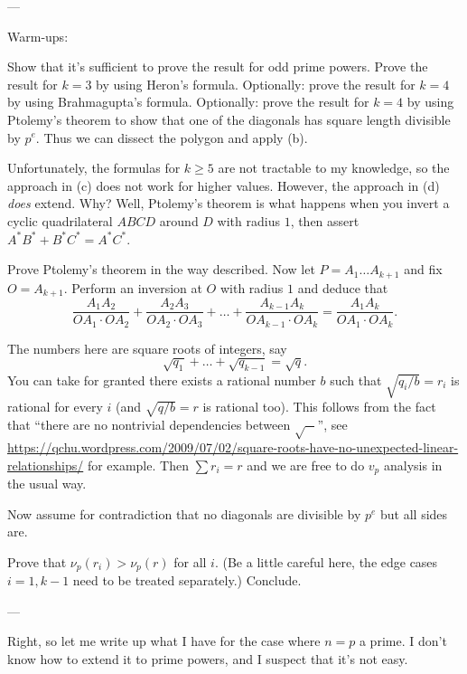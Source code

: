 ---

Warm-ups:
\begin{walk}
  \ii Show that it's sufficient to prove
  the result for odd prime powers.
  \ii Prove the result for $k = 3$ by using Heron's formula.
  \ii Optionally: prove the result for $k = 4$ by using Brahmagupta's formula.
  \ii Optionally: prove the result for $k = 4$ by using Ptolemy's theorem
  to show that one of the diagonals has square length divisible by $p^e$.
  Thus we can dissect the polygon and apply (b).
\end{walk}
Unfortunately, the formulas for $k \ge 5$ are not tractable
to my knowledge, so the approach in (c)
does not work for higher values.
However, the approach in (d) \emph{does} extend. Why?
Well, Ptolemy's theorem is what happens when you invert
a cyclic quadrilateral $ABCD$ around $D$ with radius $1$,
then assert $A^\ast B^\ast + B^\ast C^\ast = A^\ast C^\ast$.
\begin{walk}[resume]
  \ii Prove Ptolemy's theorem in the way described.
  \ii Now let $P = A_1 \dots A_{k+1}$ and fix $O = A_{k+1}$.
  Perform an inversion at $O$ with radius $1$ and deduce that
  \[
    \frac{A_1A_2}{OA_1 \cdot OA_2}
    + \frac{A_2A_3}{OA_2 \cdot OA_3}
    + \dots
    + \frac{A_{k-1} A_k}{OA_{k-1} \cdot OA_k}
    = \frac{A_1 A_k}{OA_1 \cdot OA_k}.
  \]
\end{walk}
The numbers here are square roots of integers,
say \[ \sqrt{q_1} + \dots + \sqrt{q_{k-1}} = \sqrt q. \]
You can take for granted there exists a rational number $b$
such that $\sqrt{q_i/b} = r_i$ is rational for every $i$
(and $\sqrt{q/b} = r$ is rational too).
This follows from the fact that ``there are no nontrivial dependencies
between $\sqrt{-}$'', see
\url{https://qchu.wordpress.com/2009/07/02/square-roots-have-no-unexpected-linear-relationships/}
for example.
Then $\sum r_i = r$ and
we are free to do $v_p$ analysis in the usual way.

Now assume for contradiction that no diagonals are divisible by $p^e$
but all sides are.
\begin{walk}[resume]
  \ii Prove that $\nu_p(r_i) > \nu_p(r)$ for all $i$.
  (Be a little careful here, the edge cases $i=1,k-1$
  need to be treated separately.)
  \ii Conclude.
\end{walk}

---

Right, so let me write up what I have for the case where $n = p$ a prime.
I don't know how to extend it to prime powers,
and I suspect that it's not easy.

